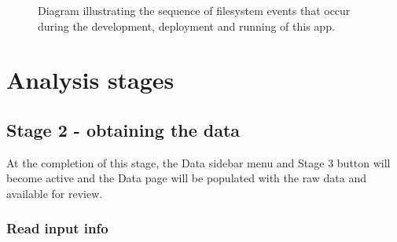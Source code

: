 \documentclass[
  8pt,
  a4paper]{article}
\begin{document}
\begin{figure}


\caption{\label{fig-diagram2}Diagram illustrating the sequence of
filesystem events that occur during the development, deployment and
running of this app.}

\end{figure}%

\section{Analysis stages}\label{analysis-stages}

\subsection{Stage 2 - obtaining the
data}\label{stage-2---obtaining-the-data}

At the completion of this stage, the Data sidebar menu and Stage 3
button will become active and the Data page will be populated with the
raw data and available for review.

\subsubsection{Read input info}\label{read-input-info}
\end{document}
